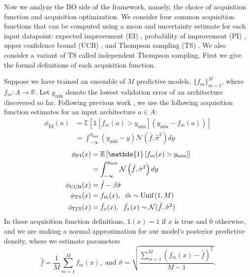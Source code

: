 \documentclass[11pt]{article}
\numberwithin{equation}{section}
\numberwithin{figure}{section}
\theoremstyle{plain}
\theoremstyle{definition}
\begin{document}
Now we analyze the BO side of the framework, namely, 
the choice of acquisition function and acquisition optimization.
We consider four common acquisition functions that can be computed using a mean and 
uncertainty estimate for each input datapoint:
expected improvement (EI) \cite{movckus1975bayesian},
probability of improvement (PI) \cite{kushner1964new},
upper confidence bound (UCB) \cite{srinivas2009gaussian},
and Thompson sampling (TS) \cite{thompson1933likelihood}.
We also consider a variant of TS called independent Thompson sampling.
First we give the formal definitions of each acquisition function.

Suppose we have trained an ensemble of $M$ predictive models,
$\{f_m\}_{m=1}^M$,
where $f_m : A \rightarrow \mathbb{R}$.
Let $y_{\min}$ denote the lowest validation error of an architecture discovered so
far.
Following previous work \cite{neiswanger2019probo},
we use the following acquisition function estimates for an
input architecture $a \in A$:
\begin{align}
    \phi_\text{EI}(a) &= \mathbb{E} \left[ 
    \mathds{1}\left[ f_m(a) > y_\text{min} \right]
    \left(y_\text{min} - f_m(a) \right) 
    \right] \\
    &= \int_{-\infty}^{y_\text{min}} 
    \left(y_\text{min} - y \right)
    \mathcal{N}\left(\hat{f}, \hat{\sigma}^2 \right)
    dy \nonumber 
\end{align}
\begin{align}    
    \phi_\text{PI}(x) &= \mathbb{E} \left[
    \mathds{1}\left[ f_m(x) > y_\text{min} \right]
    \right] \\
    &= \int_{-\infty}^{y_\text{min}} 
    \mathcal{N}\left(\hat{f}, \hat{\sigma}^2 \right)
    dy \nonumber\\
\phi_\text{UCB}(x) &= 
    \hat{f} - \beta \hat{\sigma} \\
    \phi_\text{TS}(x) &= f_{\tilde{m}}(x),
        \hspace{2mm}
        \tilde{m} \sim \text{Unif}\left(1,M\right)\\
    \phi_\text{ITS}(x) &= \tilde{f}_x(x),
        \hspace{2mm}
        \tilde{f}_x(x) \sim \mathcal{N}(\hat{f}, \hat{\sigma}^2)
\end{align}
In these acquisition function definitions, 
$\mathds{1}(x) = 1$ if $x$ is true and $0$ 
otherwise, and we are making a normal
approximation for our model's posterior predictive
density, where we estimate parameters 
\begin{equation*}
\hat{f} = \frac{1}{M}\sum_{m=1}^M f_m(x), \text{ and }
\hat{\sigma} = \sqrt{\frac{\sum_{m=1}^M (f_m(x) - \hat{f})^2}{M-1}}. 
\end{equation*}
\end{document}
